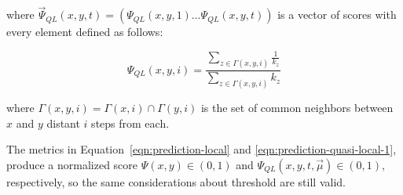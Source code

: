 where $\vec{\Psi}_{QL}(x,y,t)=(\Psi_{QL}(x,y,1)\ldots\Psi_{QL}(x,y,t))$ is a vector of scores with every element defined as follows:

\begin{equation}
\label{eqn:prediction-quasi-local-2}
\Psi_{QL}(x,y,i)=
\frac{\sum\limits_{z\in \Gamma(x,y,i)}\frac{1}{k_{z}}}
{\sum\limits_{z\in\Gamma(x,y,i)}k_{z}}
\end{equation}

where $\Gamma(x,y,i) = \Gamma(x,i) \cap \Gamma(y,i)$ is the set of common neighbors between $x$ and $y$ distant $i$ steps from each.

The metrics in Equation~\ref{eqn:prediction-local} and  \ref{eqn:prediction-quasi-local-1}, produce a normalized score $\Psi(x,y) \in (0,1)$ and $\Psi_{QL}(x,y,t,\vec{\mu}) \in (0,1)$, respectively, so the same considerations about  threshold are still valid. 